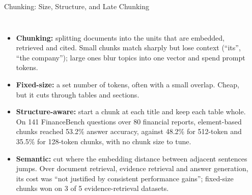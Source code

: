 \begin{frame}{Chunking: Size, Structure, and Late Chunking}
  \begin{columns}[T,onlytextwidth]
      \begin{itemize}\scriptsize\itemsep0.45em
        \item[\textcolor{red}{$\blacktriangleright$}] \textbf{Chunking:} splitting documents into the units that are embedded, retrieved and cited. Small chunks match sharply but lose context (``its'', ``the company''); large ones blur topics into one vector and spend prompt tokens.
        \item[\textcolor{red}{$\blacktriangleright$}] \textbf{Fixed-size:} a set number of tokens, often with a small overlap. Cheap, but it cuts through tables and sections.
        \item[\textcolor{red}{$\blacktriangleright$}] \textbf{Structure-aware:} start a chunk at each title and keep each table whole. On 141 FinanceBench questions over 80 financial reports, element-based chunks reached 53.2\% answer accuracy, against 48.2\% for 512-token and 35.5\% for 128-token chunks, with no chunk size to tune.
        \item[\textcolor{red}{$\blacktriangleright$}] \textbf{Semantic:} cut where the embedding distance between adjacent sentences jumps. Over document retrieval, evidence retrieval and answer generation, its cost was ``not justified by consistent performance gains''; fixed-size chunks won on 3 of 5 evidence-retrieval datasets.
      \end{itemize}
      {\centering
      }
\end{columns}
\end{frame}
